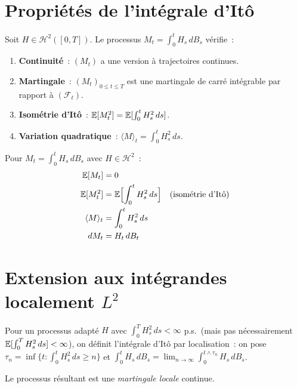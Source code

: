 \section{Propri\'et\'es de l'int\'egrale d'It\^o}

\begin{theoreme}
\label{thm:prop_ito}
Soit $H \in \mathcal{H}^2([0,T])$. Le processus $M_t = \int_0^t H_s \, dB_s$
v\'erifie~:
\begin{enumerate}
  \item \textbf{Continuit\'e}~: $(M_t)$ a une version \`a trajectoires continues.
  \item \textbf{Martingale}~: $(M_t)_{0 \leq t \leq T}$ est une martingale de carr\'e
    int\'egrable par rapport \`a $(\mathcal{F}_t)$.
  \item \textbf{Isom\'etrie d'It\^o}~: $\mathbb{E}[M_t^2] = \mathbb{E}[\int_0^t H_s^2 \, ds]$.
  \item \textbf{Variation quadratique}~: $\langle M \rangle_t = \int_0^t H_s^2 \, ds$.
\end{enumerate}
\end{theoreme}

\begin{formules}[title=\textbf{Propri\'et\'es cl\'es de l'int\'egrale d'It\^o}]
Pour $M_t = \int_0^t H_s \, dB_s$ avec $H \in \mathcal{H}^2$~:
\begin{align*}
  \mathbb{E}[M_t] &= 0 \\
  \mathbb{E}[M_t^2] &= \mathbb{E}\Bigl[\int_0^t H_s^2 \, ds\Bigr]
    \quad \text{(isom\'etrie d'It\^o)} \\
  \langle M \rangle_t &= \int_0^t H_s^2 \, ds \\
  dM_t &= H_t \, dB_t
\end{align*}
\end{formules}

\section{Extension aux int\'egrandes localement $L^2$}

\begin{definition}
Pour un processus adapt\'e $H$ avec $\int_0^T H_s^2 \, ds < \infty$ p.s.\ (mais
pas n\'ecessairement $\mathbb{E}[\int_0^T H_s^2 \, ds] < \infty$), on d\'efinit l'int\'egrale
d'It\^o par localisation~: on pose $\tau_n = \inf\{t : \int_0^t H_s^2 \, ds \geq n\}$
et $\int_0^t H_s \, dB_s = \lim_{n \to \infty} \int_0^{t \wedge \tau_n} H_s \, dB_s$.

Le processus r\'esultant est une \emph{martingale locale} continue.
\end{definition}

